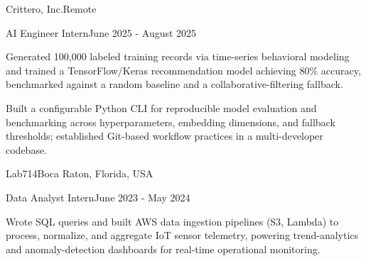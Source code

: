 \documentclass[10pt, letterpaper]{article}
\begin{document}
\vspace{\entrySpacing}
\begin{leadershipentry}{Crittero, Inc.}{Remote}
	\begin{positionentry}{AI Engineer Intern}{June 2025 - August 2025}
		\item Generated 100,000 labeled training records via time-series behavioral modeling and trained a TensorFlow/Keras recommendation model achieving 80\% accuracy, benchmarked against a random baseline and a collaborative-filtering fallback.
		\item Built a configurable Python CLI for reproducible model evaluation and benchmarking across hyperparameters, embedding dimensions, and fallback thresholds; established Git-based workflow practices in a multi-developer codebase.
	\end{positionentry}
\end{leadershipentry}

\vspace{\entrySpacing}
\begin{leadershipentry}{Lab714}{Boca Raton, Florida, USA}
	\begin{positionentry}{Data Analyst Intern}{June 2023 - May 2024}
		\item Wrote SQL queries and built AWS data ingestion pipelines (S3, Lambda) to process, normalize, and aggregate IoT sensor telemetry, powering trend-analytics and anomaly-detection dashboards for real-time operational monitoring.
	\end{positionentry}
\end{leadershipentry}

\vspace{\headerSpacing}


\section{}
\end{document}

